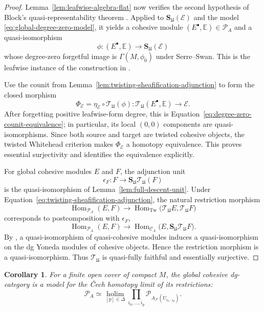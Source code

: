 \documentclass[12pt]{amsart}
\newtheorem{cor}[thm]{Corollary}
\theoremstyle{definition}
\theoremstyle{remark}
\numberwithin{equation}{section}
\newcommand{\CF}{{\mathcal F}}
\newcommand{\A}{{A}}
\newcommand{\1}{{\mathbb{1}}}
\newcommand{\Hom}{\operatorname{Hom}}
\begin{document}
\begin{proof}
Lemma~\ref{lem:leafwise-algebra-flat} now verifies the second
hypothesis of Block's quasi-representability theorem
\cite[Theorem 3.13]{Blo05}.  Applied to
$\mathbf S_{\mathfrak U}(\mathcal E)$ and the model
\eqref{eq:global-degree-zero-model}, it yields a cohesive module
$(E^\bullet,\mathbb E)\in\mathcal P_{\A}$ and a quasi-isomorphism
\[
 \phi:(E^\bullet,\mathbb E)
 \longrightarrow
 \mathbf S_{\mathfrak U}(\mathcal E)
\]
whose degree-zero forgetful image is
$\Gamma(M,\phi_0)$ under Serre--Swan.  This is the leafwise instance
of the construction in
\cite[Proposition 5.2]{Wei23}.

Use the counit from
Lemma~\ref{lem:twisting-sheafification-adjunction} to form the closed
morphism
\begin{equation}\label{eq:effective-descent-morphism}
 \Phi_{\mathcal E}
 =
 \eta_{\mathcal E}\circ\mathcal T_{\mathfrak U}(\phi):
 \mathcal T_{\mathfrak U}(E^\bullet,\mathbb E)
 \longrightarrow
 \mathcal E.
\end{equation}
After forgetting positive leafwise-form degree, this is
Equation~\eqref{eq:degree-zero-counit-equivalence}; in particular, its
local $(0,0)$ components are quasi-isomorphisms.  Since both source
and target are twisted cohesive objects, the twisted Whitehead
criterion \cite[Proposition 3.3]{Wei23} makes
$\Phi_{\mathcal E}$ a homotopy equivalence.  This proves essential
surjectivity and identifies the equivalence explicitly.

For global cohesive modules $E$ and $F$, the adjunction unit
\[
 \epsilon_F:
 F\longrightarrow
 \mathbf S_{\mathfrak U}\mathcal T_{\mathfrak U}(F)
\]
is the quasi-isomorphism of
Lemma~\ref{lem:full-descent-unit}.  Under
Equation~\eqref{eq:twisting-sheafification-adjunction}, the natural
restriction morphism
\[
 \operatorname{Hom}_{\mathcal P_{\A}}(E,F)
 \longrightarrow
 \operatorname{Hom}_{\operatorname{Tw}}
 \bigl(\mathcal T_{\mathfrak U}E,
       \mathcal T_{\mathfrak U}F\bigr)
\]
corresponds to postcomposition with $\epsilon_F$,
\[
 \Hom_{\mathcal P_{\A}}(E,F)
 \longrightarrow
 \Hom_{\mathcal C_{\A}}
 \bigl(E,\mathbf S_{\mathfrak U}\mathcal T_{\mathfrak U}F\bigr).
\]
By \cite[Proposition 3.9]{Blo05}, a quasi-isomorphism of
quasi-cohesive modules induces a quasi-isomorphism on the dg Yoneda
modules of cohesive objects.  Hence the restriction morphism is a
quasi-isomorphism.  Thus $\mathcal T_{\mathfrak U}$ is
quasi-fully faithful and essentially surjective.
\end{proof}

\begin{cor}\label{cor:cohesive-holim}
For a finite open cover of compact $M$, the global cohesive dg-category
is a model for the \v{C}ech homotopy limit of its restrictions:
\[
 \mathcal P_{\A}
 \simeq
 \operatorname*{holim}_{[p]\in\Delta}
 \prod_{i_0,\ldots,i_p}
 \mathcal P_{\A_{\CF}(U_{i_0\ldots i_p})}.
\]
\end{cor}
\end{document}
